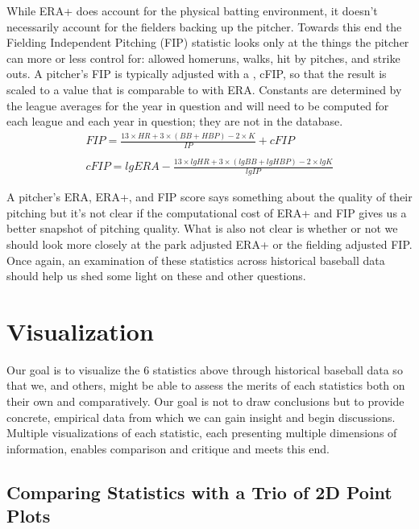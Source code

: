 \documentclass[10pt]{article}
\begin{document}
While ERA+ does account for the physical batting environment, it doesn't necessarily account for the fielders backing up the pitcher. Towards this end the Fielding Independent Pitching (FIP) statistic looks only at the things the pitcher can more or less control for: allowed homeruns, walks, hit by pitches, and strike outs.  A pitcher's FIP is typically adjusted with a , cFIP, so that the result is scaled to a value that is comparable to with ERA. Constants are determined by the league averages for the year in question and will need to be computed for each league and each year in question; they are not in the database.
\begin{equation}
  \begin{array}{ll}
    FIP = \frac{13\times HR + 3\times(BB + HBP) - 2 \times K}{IP} + cFIP \\ \\
    cFIP = lgERA - \frac{13\times lgHR + 3\times(lgBB + lgHBP) - 2 \times lgK}{lgIP}
  \end{array}
\end{equation}

A pitcher's ERA, ERA+, and FIP score says something about the quality of their pitching but it's not clear if the computational cost of ERA+ and FIP gives us a better snapshot of pitching quality. What is also not clear is whether or not we should look more closely at the park adjusted ERA+ or the fielding adjusted FIP. Once again, an examination of these statistics across historical baseball data should help us shed some light on these and other questions.

\section*{Visualization}

Our goal is to visualize the 6 statistics above through historical baseball data so that we, and others, might be able to assess the merits of each statistics both on their own and comparatively.  Our goal is not to draw conclusions but to provide concrete, empirical data from which we can gain insight and begin discussions. Multiple visualizations of each statistic, each presenting multiple dimensions of information, enables comparison and critique and meets this end.

\subsection*{Comparing Statistics with a Trio of 2D Point Plots}
\end{document}
